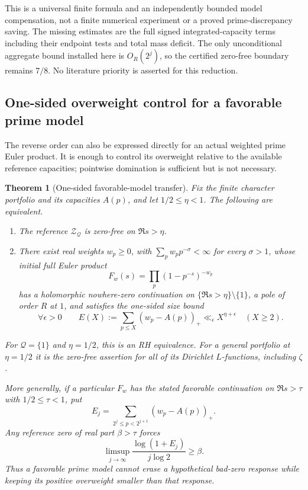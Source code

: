 \documentclass[11pt]{article}
\newtheorem{theorem}{Theorem}[section]
\theoremstyle{definition}
\begin{document}
This is a universal finite formula and an independently bounded
model compensation, not a finite numerical experiment or a proved
prime-discrepancy saving. The missing estimates are the full
signed integrated-capacity terms including their endpoint
tests and total mass deficit. The only unconditional aggregate
bound installed here is $O_R(2^j)$, so the certified
zero-free boundary remains $7/8$. No literature priority
is asserted for this reduction.


\subsection{One-sided overweight control for a favorable prime model}
\label{sec:one-sided-prime-model-transfer}

The reverse order can also be expressed directly for an actual
weighted prime Euler product. It is enough to control its
overweight relative to the available reference capacities;
pointwise domination is sufficient but is not necessary.

\begin{theorem}[One-sided favorable-model transfer]
\label{thm:one-sided-prime-model-transfer}
Fix the finite character portfolio and its capacities $A(p)$,
and let $1/2\le\eta<1$. The following are equivalent.
\begin{enumerate}
\item The reference $\mathcal Z_{\mathcal Q}$ is zero-free
on $\Re s>\eta$.
\item There exist real weights $w_p\ge0$, with
$\sum_p w_p p^{-\sigma}<\infty$ for every $\sigma>1$,
whose initial full Euler product
\[
                  F_w(s)=\prod_p(1-p^{-s})^{-w_p}
\]
has a holomorphic nowhere-zero continuation on
$\{\Re s>\eta\}\setminus\{1\}$, a pole of order $R$ at $1$,
and satisfies the one-sided size bound
\begin{equation}
 \forall\epsilon>0\qquad
 E(X):=\sum_{p\le X}(w_p-A(p))_+
             \ll_\epsilon X^{\eta+\epsilon}\quad(X\ge2).
 \label{eq:one-sided-overweight-size}
\end{equation}
\end{enumerate}
For $\mathcal Q=\{1\}$ and $\eta=1/2$, this is an RH
equivalence. For a general portfolio at $\eta=1/2$ it is
the zero-free assertion for all of its Dirichlet
$L$-functions, including $\zeta$.

More generally, if a particular $F_w$ has the stated
favorable continuation on $\Re s>\tau$ with $1/2\le\tau<1$,
put
\[
 E_j=\sum_{2^j\le p<2^{j+1}}(w_p-A(p))_+ .
\]
Any reference zero of real part $\beta>\tau$ forces
\begin{equation}
 \limsup_{j\to\infty}\frac{\log(1+E_j)}{j\log2}\ge\beta.
 \label{eq:overweight-zero-readout}
\end{equation}
Thus a favorable prime model cannot erase a hypothetical
bad-zero response while keeping its positive overweight
smaller than that response.
\end{theorem}
\end{document}
